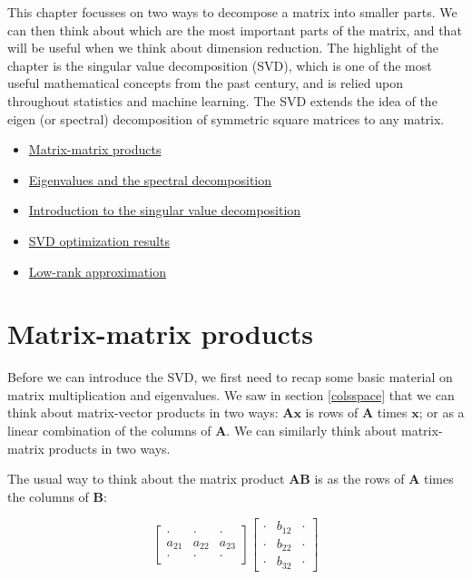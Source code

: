 \documentclass[
]{book}
\providecommand{\tightlist}{%
  \setlength{\itemsep}{0pt}\setlength{\parskip}{0pt}}
\theoremstyle{definition}
\theoremstyle{definition}
\theoremstyle{definition}
\theoremstyle{definition}
\theoremstyle{remark}
\begin{document}
This chapter focusses on two ways to decompose a matrix into smaller parts. We can then think about which are the most important parts of the matrix, and that will be useful when we think about dimension reduction. The highlight of the chapter is the singular value decomposition (SVD), which is one of the most useful mathematical concepts from the past century, and is relied upon throughout statistics and machine learning. The SVD extends the idea of the eigen (or spectral) decomposition of symmetric square matrices to any matrix.

\begin{itemize}
\tightlist
\item
  \href{https://mediaspace.nottingham.ac.uk/media/Matrix-matrix+products/1_kelw2beu}{Matrix-matrix products}
\item
  \href{https://mediaspace.nottingham.ac.uk/media/Eigenvalues+and+the+spectral+decomposition/1_drbz1eg8}{Eigenvalues and the spectral decomposition}
\item
  \href{https://mediaspace.nottingham.ac.uk/media/Singular+value+decompositionA+introduction/1_okyjnqic}{Introduction to the singular value decomposition}
\item
  \href{https://mediaspace.nottingham.ac.uk/media/Singular+value+decompositionA+optimization+results/1_9jv8zfw0}{SVD optimization results}
\item
  \href{https://mediaspace.nottingham.ac.uk/media/Singular+value+decompositionA+low+rank+approximation/1_vwbtjdzo}{Low-rank approximation}
\end{itemize}

\hypertarget{matrix-matrix}{%
\section{Matrix-matrix products}\label{matrix-matrix}}

Before we can introduce the SVD, we first need to recap some basic material on matrix multiplication and eigenvalues.
We saw in section \ref{colsspace} that we can think about matrix-vector products in two ways: \(\mathbf A\mathbf x\) is rows of \(\mathbf A\) times \(\mathbf x\); or as a linear combination of the columns of \(\mathbf A\). We can similarly think about matrix-matrix products in two ways.

The usual way to think about the matrix product \(\mathbf A\mathbf B\) is as the rows of \(\mathbf A\) times the columns of \(\mathbf B\):

\[\left[ \begin{array}{ccc}
\cdot & \cdot &\cdot\\
a_{21}&a_{22}&a_{23}\\
\cdot & \cdot &\cdot
\end{array}
\right]\left[\begin{array}{ccc}
\cdot & b_{12} &\cdot\\
\cdot&b_{22}&\cdot\\
\cdot & b_{32} &\cdot
\end{array}
\right]\]
\end{document}
